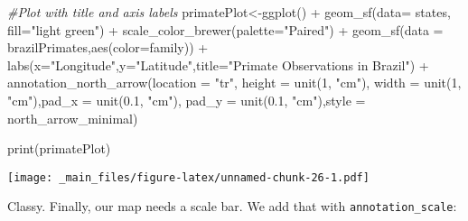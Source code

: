 \documentclass[
]{book}
\newenvironment{Shaded}{\begin{snugshade}}{\end{snugshade}}
\newcommand{\AttributeTok}[1]{\textcolor[rgb]{0.77,0.63,0.00}{#1}}
\newcommand{\CommentTok}[1]{\textcolor[rgb]{0.56,0.35,0.01}{\textit{#1}}}
\newcommand{\DecValTok}[1]{\textcolor[rgb]{0.00,0.00,0.81}{#1}}
\newcommand{\FloatTok}[1]{\textcolor[rgb]{0.00,0.00,0.81}{#1}}
\newcommand{\FunctionTok}[1]{\textcolor[rgb]{0.00,0.00,0.00}{#1}}
\newcommand{\NormalTok}[1]{#1}
\newcommand{\OtherTok}[1]{\textcolor[rgb]{0.56,0.35,0.01}{#1}}
\newcommand{\SpecialCharTok}[1]{\textcolor[rgb]{0.00,0.00,0.00}{#1}}
\newcommand{\StringTok}[1]{\textcolor[rgb]{0.31,0.60,0.02}{#1}}
\begin{document}
\begin{Shaded}
\begin{Highlighting}[]
\CommentTok{\#Plot with title and axis labels}
\NormalTok{primatePlot}\OtherTok{\textless{}{-}}\FunctionTok{ggplot}\NormalTok{() }\SpecialCharTok{+} 
  \FunctionTok{geom\_sf}\NormalTok{(}\AttributeTok{data=}\NormalTok{ states, }\AttributeTok{fill=}\StringTok{"light green"}\NormalTok{) }\SpecialCharTok{+}
  \FunctionTok{scale\_color\_brewer}\NormalTok{(}\AttributeTok{palette=}\StringTok{"Paired"}\NormalTok{) }\SpecialCharTok{+}
  \FunctionTok{geom\_sf}\NormalTok{(}\AttributeTok{data =}\NormalTok{ brazilPrimates,}\FunctionTok{aes}\NormalTok{(}\AttributeTok{color=}\NormalTok{family)) }\SpecialCharTok{+}
  \FunctionTok{labs}\NormalTok{(}\AttributeTok{x=}\StringTok{"Longitude"}\NormalTok{,}\AttributeTok{y=}\StringTok{"Latitude"}\NormalTok{,}\AttributeTok{title=}\StringTok{"Primate Observations in Brazil"}\NormalTok{)  }\SpecialCharTok{+}
   \FunctionTok{annotation\_north\_arrow}\NormalTok{(}\AttributeTok{location =} \StringTok{"tr"}\NormalTok{,  }\AttributeTok{height =} \FunctionTok{unit}\NormalTok{(}\DecValTok{1}\NormalTok{, }\StringTok{"cm"}\NormalTok{), }\AttributeTok{width =} \FunctionTok{unit}\NormalTok{(}\DecValTok{1}\NormalTok{, }\StringTok{"cm"}\NormalTok{),}\AttributeTok{pad\_x =} \FunctionTok{unit}\NormalTok{(}\FloatTok{0.1}\NormalTok{, }\StringTok{"cm"}\NormalTok{), }\AttributeTok{pad\_y =} \FunctionTok{unit}\NormalTok{(}\FloatTok{0.1}\NormalTok{, }\StringTok{"cm"}\NormalTok{),}\AttributeTok{style =}\NormalTok{ north\_arrow\_minimal)}


\FunctionTok{print}\NormalTok{(primatePlot)}
\end{Highlighting}
\end{Shaded}

\texttt{[image: \_main\_files/figure-latex/unnamed-chunk-26-1.pdf]}

Classy. Finally, our map needs a scale bar. We add that with \texttt{annotation\_scale}:
\end{document}
